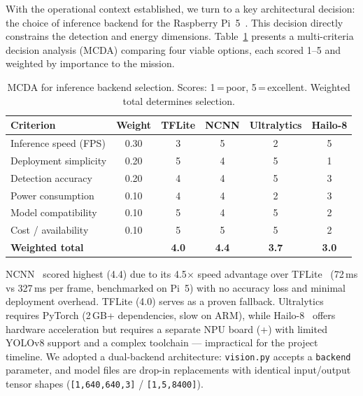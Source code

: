 \documentclass[10pt,a4paper]{article}
\newcommand{\compactTable}{\small\setlength{\tabcolsep}{3pt}\renewcommand{\arraystretch}{1.05}}
\begin{document}
With the operational context established, we turn to a key architectural decision: the choice of inference backend for the Raspberry Pi~5~\citep{raspberrypi5,arm_a76}. This decision directly constrains the detection and energy dimensions. Table~\ref{tab:mcda-backend} presents a multi-criteria decision analysis (MCDA) comparing four viable options, each scored 1--5 and weighted by importance to the mission.

\begin{table}[H]
  \centering\compactTable
  \caption{MCDA for inference backend selection. Scores: 1\,=\,poor, 5\,=\,excellent. Weighted total determines selection.}\label{tab:mcda-backend}
  \begin{tabularx}{\linewidth}{@{}l c cccc@{}}
    \toprule
    \textbf{Criterion} & \textbf{Weight} & \textbf{TFLite} & \textbf{NCNN} & \textbf{Ultralytics} & \textbf{Hailo-8} \\
    \midrule
    Inference speed (FPS)     & 0.30 & 3 & 5 & 2 & 5 \\
    Deployment simplicity     & 0.20 & 5 & 4 & 5 & 1 \\
    Detection accuracy        & 0.20 & 4 & 4 & 5 & 3 \\
    Power consumption         & 0.10 & 4 & 4 & 2 & 3 \\
    Model compatibility       & 0.10 & 5 & 4 & 5 & 2 \\
    Cost / availability       & 0.10 & 5 & 5 & 5 & 2 \\
    \midrule
    \textbf{Weighted total}   &      & \textbf{4.0} & \textbf{4.4} & \textbf{3.7} & \textbf{3.0} \\
    \bottomrule
  \end{tabularx}
\end{table}

NCNN~\cite{ncnn} scored highest (4.4) due to its 4.5$\times$ speed advantage over TFLite~\cite{tflite} (72\,ms vs 327\,ms per frame, benchmarked on Pi~5) with no accuracy loss and minimal deployment overhead. TFLite (4.0) serves as a proven fallback. Ultralytics requires PyTorch (2\,GB+ dependencies, slow on ARM), while Hailo-8~\citep{hailo2023datasheet} offers hardware acceleration but requires a separate NPU board (+) with limited YOLOv8 support and a complex toolchain --- impractical for the project timeline. We adopted a dual-backend architecture: \texttt{vision.py} accepts a \texttt{backend} parameter, and model files are drop-in replacements with identical input/output tensor shapes (\texttt{[1,640,640,3]} / \texttt{[1,5,8400]}).
\end{document}
